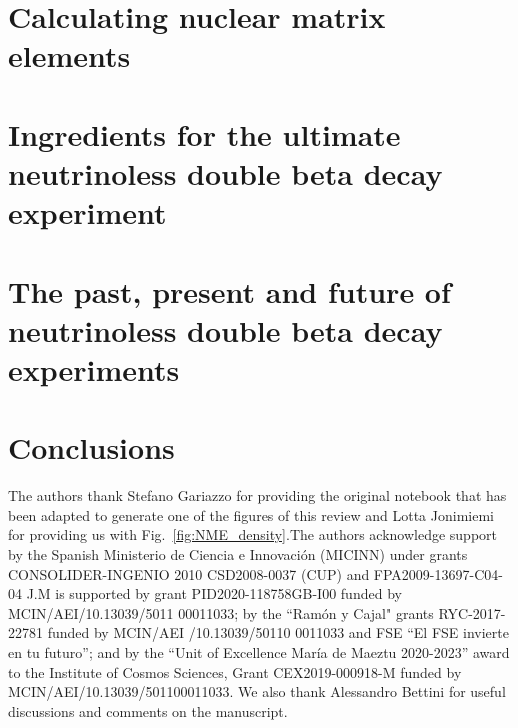 \documentclass[sn-mathphys]{sn-jnl}%
\begin{document}
\section{Calculating nuclear matrix elements} \label{sec:nme}


\section{Ingredients for the ultimate neutrinoless double beta decay experiment} \label{sec:ingredients}


\section{The past, present and future of neutrinoless double beta decay experiments} \label{sec:experiments}


\section{Conclusions}



\backmatter

The authors thank Stefano Gariazzo for providing the original notebook that has been adapted to generate one of the figures of this review and Lotta Jonimiemi for providing us with Fig.~\ref{fig:NME_density}.The authors acknowledge support by the Spanish Ministerio de Ciencia e Innovaci\'on (MICINN) under grants CONSOLIDER-INGENIO 2010 CSD2008-0037 (CUP) and FPA2009-13697-C04-04
J.M is supported by grant PID2020-118758GB-I00 
funded by MCIN/AEI/10.13039/5011 00011033; 
by the ``Ram\'on y Cajal" grants RYC-2017-22781 funded by MCIN/AEI /10.13039/50110 0011033 and FSE “El FSE invierte en tu futuro”;  
and by the  “Unit of Excellence Mar\'ia de Maeztu 2020-2023” award to the Institute of Cosmos Sciences, Grant CEX2019-000918-M funded by MCIN/AEI/10.13039/501100011033.
We also thank Alessandro Bettini 
for useful discussions and comments on the manuscript.



\end{document}

